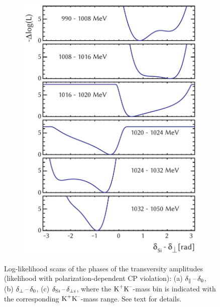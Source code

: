 \begin{figure}[tbp]
  \vspace*{0.02\textwidth}
  \begin{subfigure}{0.55\textwidth}
    \includegraphics[width=\textwidth]{graphics/results/NLL_polarDep_SWavePhases}
    \caption{}
    \label{fig:NLL_polarDep_transPhases_SWave}
  \end{subfigure}

  \caption{Log-likelihood scans of the phases of the transversity amplitudes (likelihood with polarization-dependent CP violation):
           (a) $\delparzero$, (b) $\delperpzero$,
           (c) $\delSperp[i]$, where the $\KK$-mass bin is indicated with the corresponding $\KK$-mass range.
           See text for details.}
  \label{fig:NLL_polarDep_transPhases}
\end{figure}

